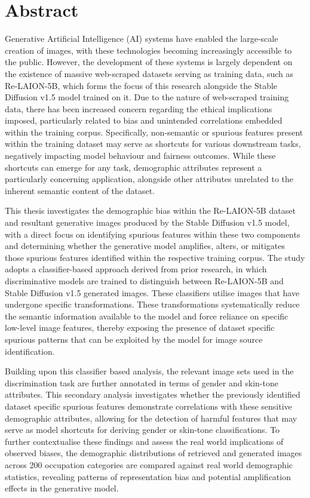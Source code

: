 \chapter*{Abstract}
Generative Artificial Intelligence (AI) systems have enabled the large-scale creation of images, with these technologies becoming increasingly accessible to the public. However, the development of these systems is largely dependent on the existence of massive web-scraped datasets serving as training data, such as Re-LAION-5B, which forms the focus of this research alongside the Stable Diffusion v1.5 model trained on it. Due to the nature of web-scraped training data, there has been increased concern regarding the ethical implications imposed, particularly related to bias and unintended correlations embedded within the training corpus. Specifically, non-semantic or spurious features present within the training dataset may serve as shortcuts for various downstream tasks, negatively impacting model behaviour and fairness outcomes. While these shortcuts can emerge for any task, demographic attributes represent a particularly concerning application, alongside other attributes unrelated to the inherent semantic content of the dataset.

This thesis investigates the demographic bias within the Re-LAION-5B dataset and resultant generative images produced by the Stable Diffusion v1.5 model, with a direct focus on identifying spurious features within these two components and determining whether the generative model amplifies, alters, or mitigates those spurious features identified within the respective training corpus. The study adopts a classifier-based approach derived from prior research, in which discriminative models are trained to distinguish between Re-LAION-5B and Stable Diffusion v1.5 generated images. These classifiers utilise images that have undergone specific transformations. These transformations systematically reduce the semantic information available to the model and force reliance on specific low-level image features, thereby exposing the presence of dataset specific spurious patterns that can be exploited by the model for image source identification.

Building upon this classifier based analysis, the relevant image sets used in the discrimination task are further annotated in terms of gender and skin-tone attributes. This secondary analysis investigates whether the previously identified dataset specific spurious features demonstrate correlations with these sensitive demographic attributes, allowing for the detection of harmful features that may serve as model shortcuts for deriving gender or skin-tone classifications. To further contextualise these findings and assess the real world implications of observed biases, the demographic distributions of retrieved and generated images across 200 occupation categories are compared against real world demographic statistics, revealing patterns of representation bias and potential amplification effects in the generative model.

